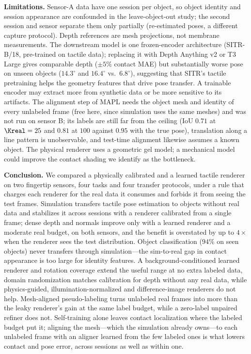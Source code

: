 \noindent\textbf{Limitations.}
Sensor-A data have one session per object, so object identity and session appearance are confounded in the leave-object-out study; the second session and sensor separate them only partially (re-estimated poses, a different capture protocol). Depth references are mesh projections, not membrane measurements. The downstream model is one frozen-encoder architecture (SITR-B/18, pre-trained on tactile data); replacing it with Depth Anything v2 or T3 Large gives comparable depth ($\pm5\%$ contact MAE) but substantially worse pose on unseen objects ($14.3^\circ$ and $16.4^\circ$ vs.\ $6.8^\circ$), suggesting that SITR's tactile pretraining helps the geometry features that drive pose transfer. A trainable encoder may extract more from synthetic data or be more sensitive to its artifacts. The alignment step of MAPL needs the object mesh and identity of every unlabeled frame (free here, since simulation uses the same meshes) and was not run on sensor B; its labels are still far from the ceiling (IoU $0.71$ at $\Kreal=25$ and $0.81$ at $100$ against $0.95$ with the true pose), translation along a line pattern is unobservable, and test-time alignment likewise assumes a known object. The physical renderer uses a geometric gel model; a mechanical model could improve the contact shading we identify as the bottleneck.

\noindent\textbf{Conclusion.}
We compared a physically calibrated and a learned tactile renderer on two fingertip sensors, four tasks and four transfer protocols, under a rule that charges each renderer for the real data it consumes and forbids it from seeing the test frames. Simulation transfers tactile pose estimation to objects without real data and stabilizes it across sessions with a renderer calibrated from a single frame; dense depth and normals improve only with a learned renderer and a moderate real budget, on both sensors, and the benefit is overstated by up to $4\times$ when the renderer sees the test distribution. Object classification ($94\%$ on seen objects) never transfers through simulation---the sim-to-real gap in contact appearance is too large for identity features. A background-conditioned learned renderer and rotation coverage extend the useful range at no extra labeled data, domain randomization matches calibration for depth without any real data, while physics-guided, illumination-normalized and difference-image renderers do not help. Mesh-aligned pseudo-labeling turns unlabeled real frames into more than the leaky renderer's gain at the same label budget, while a zero-label unpaired refiner does not. Self-training alone leaves contact localization where the labeled budget put it; aligning the mesh---which the simulation already owns---to each unlabeled frame with an aligner learned from the few labeled ones is what lowers contact and pose error, across sessions as well as within one.
